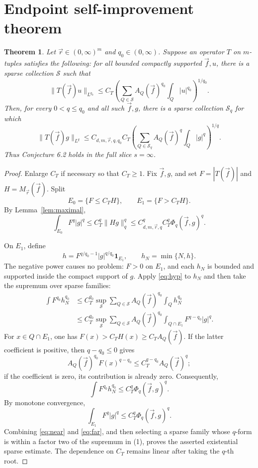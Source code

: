 \documentclass[11pt]{article}
\newtheorem{theorem}{Theorem}
\newcommand{\1}{\mathbf 1}
\newcommand{\Aq}[2]{A_{#1}(#2)}
\newcommand{\Mvec}{M_{\vec r}}
\begin{document}
\section{Endpoint self-improvement theorem}

\begin{theorem}\label{thm:main}
Let $\vec r\in(0,\infty)^m$ and $q_0\in(0,\infty)$. Suppose an operator $T$
on $m$-tuples satisfies the following: for all bounded compactly supported
$\vec f,u$, there is a sparse collection $\mathcal S$ such that
\begin{equation}\label{eq:hyp}
 \|T(\vec f)u\|_{L^{q_0}}
 \le C_T
 \left(\sum_{Q\in\mathcal S}\Aq{Q}{\vec f}^{q_0}
                    \int_Q|u|^{q_0}\right)^{1/q_0}.
\end{equation}
Then, for every $0<q\le q_0$ and all such $\vec f,g$, there is a sparse
collection $\mathcal S_q$ for which
\[
 \|T(\vec f)g\|_{L^q}
 \le C_{d,m,\vec r,q,q_0}C_T
 \left(\sum_{Q\in\mathcal S_q}\Aq{Q}{\vec f}^{q}
                    \int_Q|g|^{q}\right)^{1/q}.
\]
Thus Conjecture 6.2 holds in the full slice $s=\infty$.
\end{theorem}

\begin{proof}
Enlarge $C_T$ if necessary so that $C_T\ge1$. Fix $\vec f,g$, and set
$F=|T(\vec f)|$ and $H=\Mvec(\vec f)$. Split
\[
 E_0=\{F\le C_T H\},\qquad E_1=\{F>C_T H\}.
\]
By Lemma~\ref{lem:maximal},
\begin{equation}\label{eq:near}
 \int_{E_0}F^q|g|^q
 \le C_T^q\|Hg\|_q^q
 \le C_{d,m,\vec r,q}^q C_T^q\Phi_q(\vec f,g)^q.
\end{equation}

On $E_1$, define
\[
 h=F^{q/q_0-1}|g|^{q/q_0}\1_{E_1},
 \qquad h_N=\min\{N,h\}.
\]
The negative power causes no problem: $F>0$ on $E_1$, and each $h_N$ is
bounded and supported inside the compact support of $g$. Apply
\eqref{eq:hyp} to $h_N$ and then take the supremum over sparse families:
\begin{align*}
 \int F^{q_0}h_N^{q_0}
 &\le C_T^{q_0}
 \sup_{\mathcal S}\sum_{Q\in\mathcal S}
       \Aq{Q}{\vec f}^{q_0}\int_Q h_N^{q_0} \\
 &\le C_T^{q_0}
 \sup_{\mathcal S}\sum_{Q\in\mathcal S}
       \Aq{Q}{\vec f}^{q_0}
       \int_{Q\cap E_1}F^{q-q_0}|g|^q.
\end{align*}
For $x\in Q\cap E_1$, one has
$F(x)>C_T H(x)\ge C_T\Aq{Q}{\vec f}$. If the latter coefficient is positive,
then $q-q_0\le0$ gives
\[
 \Aq{Q}{\vec f}^{q_0}F(x)^{q-q_0}
 \le C_T^{q-q_0}\Aq{Q}{\vec f}^{q};
\]
if the coefficient is zero, its contribution is already zero. Consequently,
\[
 \int F^{q_0}h_N^{q_0}
 \le C_T^q\Phi_q(\vec f,g)^q.
\]
By monotone convergence,
\begin{equation}\label{eq:far}
 \int_{E_1}F^q|g|^q\le C_T^q\Phi_q(\vec f,g)^q.
\end{equation}
Combining \eqref{eq:near} and \eqref{eq:far}, and then selecting a sparse
family whose $q$-form is within a factor two of the supremum in (1), proves
the asserted existential sparse estimate. The dependence on $C_T$ remains
linear after taking the $q$-th root.
\end{proof}
\end{document}
